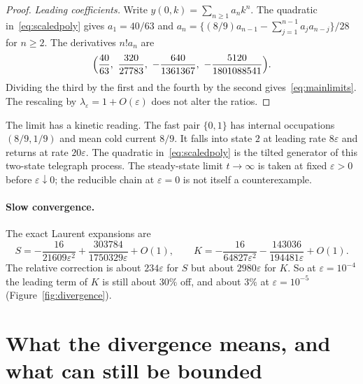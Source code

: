 \documentclass[11pt,a4paper]{article}
\theoremstyle{remark}\newtheorem{remark}[theorem]{Remark}
\newcommand{\eps}{\varepsilon}
\begin{document}
\begin{proof}
\emph{Leading coefficients.} Write $y(0,k)=\sum_{n\ge1}a_nk^n$. The quadratic in~\eqref{eq:scaledpoly} gives $a_1=40/63$ and $a_n=\{(8/9)a_{n-1}-\sum_{j=1}^{n-1}a_ja_{n-j}\}/28$ for $n\ge2$. The derivatives $n!a_n$ are
\begin{equation}\label{eq:yleading}
\Bigl(\frac{40}{63},\ \frac{320}{27783},\ -\frac{640}{1361367},\ -\frac{5120}{1801088541}\Bigr).
\end{equation}
Dividing the third by the first and the fourth by the second gives~\eqref{eq:mainlimits}. The rescaling by $\lambda_\eps=1+O(\eps)$ does not alter the ratios.
\end{proof}

The limit has a kinetic reading. The fast pair $\{0,1\}$ has internal occupations $(8/9,1/9)$ and mean cold current $8/9$. It falls into state $2$ at leading rate $8\eps$ and returns at rate $20\eps$. The quadratic in~\eqref{eq:scaledpoly} is the tilted generator of this two-state telegraph process. The steady-state limit $t\to\infty$ is taken at fixed $\eps>0$ before $\eps\downarrow0$; the reducible chain at $\eps=0$ is not itself a counterexample.

\paragraph{Slow convergence.} The exact Laurent expansions are
\begin{equation}\label{eq:laurent}
S=-\frac{16}{21609\eps^2}+\frac{303784}{1750329\eps}+O(1),\qquad
K=-\frac{16}{64827\eps^2}-\frac{143036}{194481\eps}+O(1).
\end{equation}
The relative correction is about $234\eps$ for $S$ but about $2980\eps$ for $K$. So at $\eps=10^{-4}$ the leading term of $K$ is still about $30\%$ off, and about $3\%$ at $\eps=10^{-5}$ (Figure~\ref{fig:divergence}).

\section{What the divergence means, and what can still be bounded}\label{sec:normalised}
\end{document}
